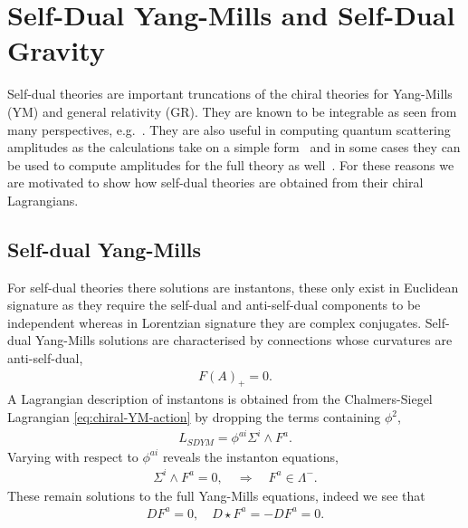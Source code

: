 \documentclass[10pt]{report}
\theoremstyle{definition}
\begin{document}
\section{Self-Dual Yang-Mills and Self-Dual Gravity}\label{sec:self-dual-YM-and-gravity}
Self-dual theories are important truncations of the chiral theories for Yang-Mills (YM) and general relativity (GR). They are known to be integrable as seen from many perspectives, e.g.~\cite{Self_Dual_Yang_Bardee_1996,From_2D_integra_Dunajs_1998}. They are also useful in computing quantum scattering amplitudes as the calculations take on a simple form~\cite{One_loop_self_d_Bern_1997,One_loop_i_n_i_Bern_1994,One_loop_n_poin_Bern_1998,Multi_leg_one_l_Bern_1999,Self_Dual_Gravi_Krasno_2016} and in some cases they can be used to compute amplitudes for the full theory as well~\cite{Celestial_holog_Costel_2022}. For these reasons we are motivated to show how self-dual theories are obtained from their chiral Lagrangians.

\subsection{Self-dual Yang-Mills}
For self-dual theories there solutions are instantons, these only exist in Euclidean signature as they require the self-dual and anti-self-dual components to be independent whereas in Lorentzian signature they are complex conjugates. Self-dual Yang-Mills solutions are characterised by connections whose curvatures are anti-self-dual,
\begin{align}
    F{(A)}_+ = 0.
\end{align}
A Lagrangian description of instantons is obtained from the Chalmers-Siegel Lagrangian \cref{eq:chiral-YM-action} by dropping the terms containing $\phi^2$,
\begin{align}
    L_{SDYM} = \phi^{ai} \Sigma^i \wedge F^a. \label{eq:self-dual-yang-mills-action}
\end{align}
Varying with respect to $\phi^{ai}$ reveals the instanton equations,
\begin{align}
    \Sigma^i \wedge F^a = 0, \quad \Rightarrow \quad F^a \in \Lambda^-.
\end{align}
These remain solutions to the full Yang-Mills equations, indeed we see that
\begin{align}
    D F^a = 0, \quad D \star F^a = -D F^a = 0.
\end{align}
\end{document}
